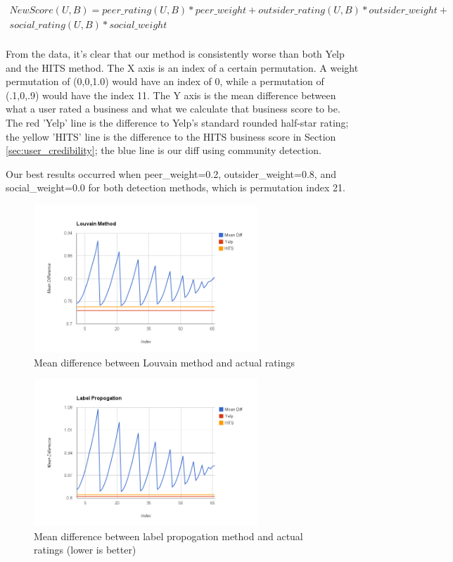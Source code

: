 \documentclass[10pt]{article}
\begin{document}
\begin{multline}
\label{avg_peer_value}
NewScore(U, B) = peer\_rating(U, B)*peer\_weight + outsider\_rating(U, B)*outsider\_weight + \\
social\_rating(U, B) * social\_weight \\
\end{multline}

From the data, it's clear that our method is consistently worse than both Yelp and the HITS method.  The X axis is an index of a certain permutation.  A weight permutation of (0,0,1.0) would have an index of 0, while a permutation of (.1,0,.9) would have the index 11.  The Y axis is the mean difference between what a user rated a business and what we calculate that business score to be. The red 'Yelp' line is the difference to Yelp's standard rounded half-star rating; the yellow 'HITS' line is the difference to the HITS business score in Section \ref{sec:user_credibility}; the blue line is our diff using community detection.

Our best results occurred when peer\_weight=0.2, outsider\_weight=0.8, and social\_weight=0.0 for both detection methods, which is permutation index 21.

\begin{figure}[ht]
  \centering
    \includegraphics[width=0.75\textwidth]{louvain_results.png}
  \caption{Mean difference between Louvain method and actual ratings}
  \label{fig:louvain_results}
\end{figure}

\begin{figure}[ht]
  \centering
    \includegraphics[width=0.75\textwidth]{label_prop_results.png}
  \caption{Mean difference between label propogation method and actual ratings (lower is better)}
  \label{fig:label_prop_results}
\end{figure}
\end{document}
